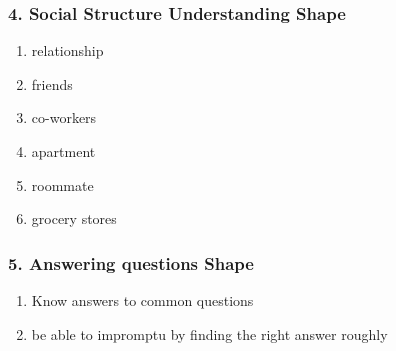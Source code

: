 \begin{frame} 
\frametitle{4. Social Structure Understanding Shape} 
\begin{enumerate} 
\item \small relationship
\item \small friends
\item \small co-workers
\item \small apartment 
\item \small roommate
\item \small grocery stores 
\end{enumerate}
\end{frame} 

\begin{frame} 
\frametitle{5. Answering questions Shape} 
\begin{enumerate} 
\item \small Know answers to common questions
\item \small be able to impromptu by finding the right answer roughly 
\end{enumerate}
\end{frame} 

